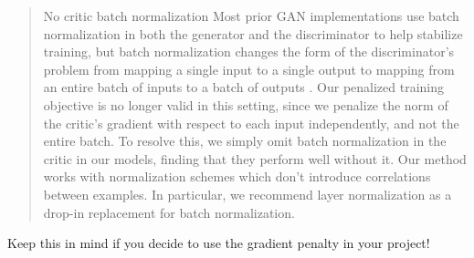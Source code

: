 \begin{quote}
No critic batch normalization Most prior GAN implementations use batch normalization in both the generator and the discriminator to help stabilize training, but batch normalization
changes the form of the discriminator’s problem from mapping a single input to a single output to
mapping from an entire batch of inputs to a batch of outputs . Our penalized training objective
is no longer valid in this setting, since we penalize the norm of the critic’s gradient with respect
to each input independently, and not the entire batch. To resolve this, we simply omit batch normalization in the critic in our models, finding that they perform well without it. Our method works
with normalization schemes which don’t introduce correlations between examples. In particular, we
recommend layer normalization as a drop-in replacement for batch normalization.
\end{quote}

Keep this in mind if you decide to use the gradient penalty in your
project!
